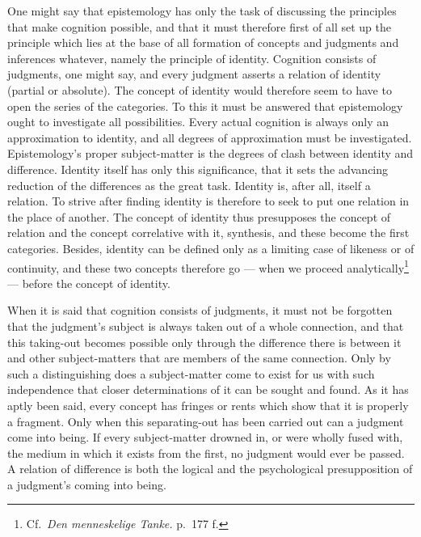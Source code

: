 \documentclass[12pt]{book}
\newcommand{\opage}[1]{\marginnote{\footnotesize\textit{[#1]}}}
\begin{document}
One might say that epistemology has only the task of discussing the principles
that make cognition possible, and that it must therefore first of all set up the
principle which lies at the base of all formation of concepts and judgments and
inferences whatever, namely the principle of identity. Cognition consists of
judgments, one might say, and every judgment asserts a relation of identity
(partial or absolute). The concept of identity would therefore seem to have to
open the series of the categories. To this it must be answered that epistemology
ought to investigate all possibilities. Every actual cognition is always only an
approximation to identity, and all degrees of approximation must be
investigated. Epistemology's proper subject-matter is the degrees of clash
between identity and difference. Identity itself has only this significance,
that it sets the advancing reduction of the differences as the great task.
Identity is, after all, itself a relation. To strive after finding identity is
therefore to seek to put one relation in the place of another. The concept of
identity thus presupposes the concept of relation and the concept correlative
with it, synthesis, and these become the first categories. Besides, identity can
be defined only as a limiting case of likeness or of continuity, and these two
concepts therefore go --- when we proceed
analytically\footnote{Cf.\ \textit{Den menneskelige Tanke.} p.\ 177 f.} ---
before the concept of identity.

\opage{43}When it is said that cognition consists of judgments, it must not be forgotten
that the judgment's subject is always taken out of a whole connection, and that
this taking-out becomes possible only through the difference there is between it
and other subject-matters that are members of the same connection. Only by such
a distinguishing does a subject-matter come to exist for us with such
independence that closer determinations of it can be sought and found. As it has
aptly been said, every concept has fringes or rents which show that it is
properly a fragment. Only when this separating-out has been carried out can a
judgment come into being. If every subject-matter drowned in, or were wholly
fused with, the medium in which it exists from the first, no judgment would ever
be passed. A relation of difference is both the logical and the psychological
presupposition of a judgment's coming into being.
\end{document}
